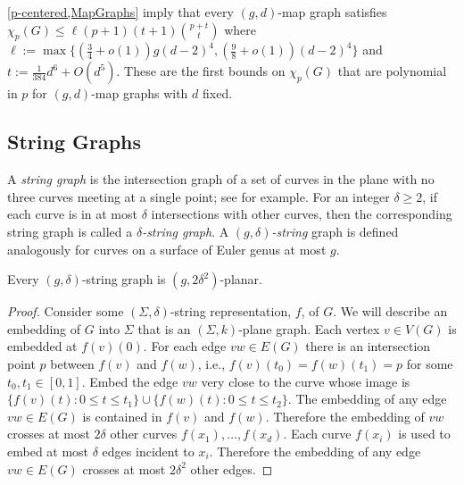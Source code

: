 \documentclass{patmorin}
\renewcommand{\le}{\leqslant}
\renewcommand{\geq}{\geqslant}
\begin{document}
\cref{p-centered,MapGraphs} imply that every $(g,d)$-map graph satisfies $\chi_p(G)\le \ell (p+1)(t+1)\binom{p+t}{t}$ where $\ell:=\max\{(\tfrac{3}{4}+o(1)) g(d-2)^4, (\tfrac{9}{8}+o(1)) (d-2)^4\}$ and $t:=  \tfrac{1}{384} d^6 + O(d^5)$. These are the first bounds on $\chi_p(G)$ that are polynomial in $p$ for $(g,d)$-map graphs with $d$ fixed. 


\subsection{String Graphs}

A \emph{string graph} is the intersection graph of a set of curves in the plane with no three curves meeting at a single point; see  \cite{PachToth-DCG02,FP10,FP14} for example. For an integer $\delta\geq 2$, if each curve is in at most $\delta$ intersections with other curves, then the corresponding string graph is called a \emph{$\delta$-string graph}. A \emph{$(g,\delta)$-string} graph is defined analogously for curves on a surface of Euler genus at most $g$.  


\begin{lem}
\label{StringGraph}
Every $(g,\delta)$-string graph is $(g,2\delta^2)$-planar. 
\end{lem}

\begin{proof}
Consider some $(\Sigma,\delta)$-string representation, $f$, of $G$.  We will describe an embedding of $G$ into $\Sigma$ that is an $(\Sigma,k)$-plane graph.  Each vertex $v\in V(G)$ is embedded at $f(v)(0)$. For each edge $vw\in E(G)$ there is an intersection point $p$ between $f(v)$ and $f(w)$, i.e., $f(v)(t_0)=f(w)(t_1)=p$ for some $t_0,t_1\in[0,1]$.  Embed the edge $vw$ very close to the curve whose image is $\{f(v)(t): 0\le t\le t_1\}\cup \{ f(w)(t): 0 \le t\le t_2\}$. The embedding of any edge $vw\in E(G)$ is contained in $f(v)$ and $f(w)$.  Therefore the embedding of $vw$ crosses at most $2\delta$ other curves $f(x_1),\ldots,f(x_d)$.  Each curve $f(x_i)$ is used to embed at most $\delta$ edges incident to $x_i$.  Therefore the embedding of any edge $vw\in E(G)$ crosses at most $2\delta^2$ other edges.  
\end{proof}
\end{document}
